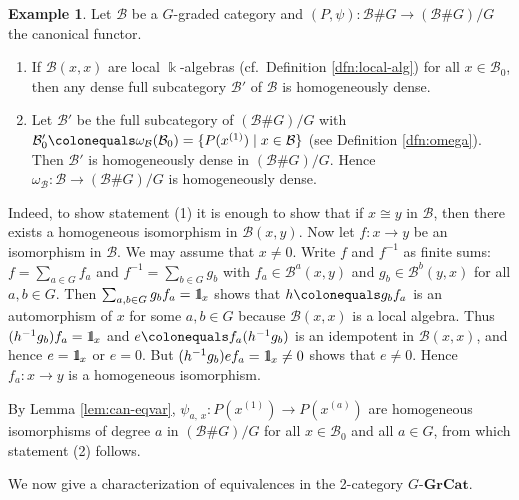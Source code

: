 \documentclass{surv-l}
\numberwithin{equation}{chapter}
\numberwithin{figure}{chapter}
\theoremstyle{plain}
\theoremstyle{definition}
\newtheorem{exm}[thm]{Example}
\theoremstyle{remark}
\newcommand{\id}{1\kern-.25em{\text{{\rm l}}}}
\newcommand{\GGrCat}{G\text{-}\mathbf{GrCat}}
\begin{document}
\begin{exm}\label{exm:hmg-dense}
Let $\mathcal{B}$ be a $G$-graded category and
$(P,\psi)\colon\mathcal{B}\#G\to(\mathcal{B}\#G)/G$
the canonical functor.
\begin{enumerate}
\item
If $\mathcal{B}(x, x)$ are local $\Bbbk$-algebras (cf.\ Definition \ref{dfn:local-alg})
for all $x \in \mathcal{B}_0$,
then any dense full subcategory $\mathcal{B}'$ of $\mathcal{B}$ is homogeneously dense.
\item
Let $\mathcal{B}'$ be the full subcategory
of $(\mathcal{B} \# G)/G$ with $\mathcal{B}'_0\colonequals  \omega_{\mathcal{B}}(\mathcal{B}_0) =\{P(x^{(1)}) \mid x \in \mathcal{B}\}$
(see Definition \ref{dfn:omega}).
Then $\mathcal{B}'$ is homogeneously dense in $(\mathcal{B} \# G)/G$.
Hence $\omega_{\mathcal{B}} \colon \mathcal{B} \to (\mathcal{B} \# G)/G$ is homogeneously dense.
\end{enumerate}
Indeed, to show statement (1) it is enough to show that if $x \cong y$ in $\mathcal{B}$, then there exists
a homogeneous isomorphism in $\mathcal{B}(x, y)$.
Now let $f \colon x \to y$ be an isomorphism in $\mathcal{B}$.
We may assume that $x \ne 0$.
Write $f$ and $f^{-1}$
as finite sums: $f = \sum_{a\in G}f_a$
and $f^{-1} = \sum_{b\in G}g_b$ with $f_a\in \mathcal{B}^a(x, y)$ and $g_b \in \mathcal{B}^b(y, x)$
for all $a, b \in G$.
Then $\sum_{a, b \in G}g_bf_a = \id_x$ shows that $h\colonequals g_bf_a$ is an automorphism of $x$
for some $a, b \in G$ because $\mathcal{B}(x, x)$ is a local algebra.
Thus $(h^{-1} g_b)f_a=\id_x$ and $e\colonequals f_a(h^{-1} g_b)$ is an idempotent in
$\mathcal{B}(x, x)$, and hence $e=\id_x$ or $e=0$.
But $(h^{-1} g_b)ef_a=\id_x \ne 0$ shows that $e \ne 0$.
Hence $f_a \colon x \to y$
is a homogeneous isomorphism.

By Lemma \ref{lem:can-eqvar},
$\psi_{a,\, x} \colon P(x^{(1)}) \to P(x^{(a)})$
are homogeneous isomorphisms of degree $a$ in $(\mathcal{B} \# G)/G$
for all $x \in \mathcal{B}_0$ and all $a \in G$,
from which statement (2) follows.
\end{exm}

We now give a characterization of equivalences in the 2-category $\GGrCat$.
\end{document}
